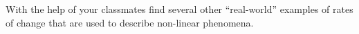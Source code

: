 {With the help of your classmates find several other ``real-world'' examples of rates of change that are used to describe non-linear phenomena.}
{}